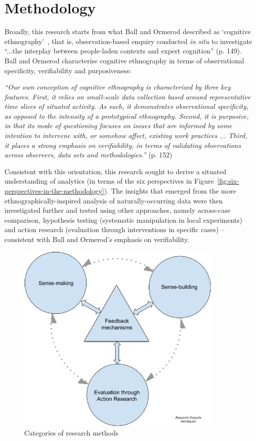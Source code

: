 \section{Methodology}
Broadly, this research starts from what Ball and Ormerod described as `cognitive ethnography'~\citep{ball2000_putting_ethnography_to_work_cognitive_ethnography}, that is, observation-based enquiry conducted \textit{in situ} to investigate ``...the interplay between people-laden contexts and expert cognition'' (p. 149). Ball and Ormerod characterise cognitive ethnography in terms of observational specificity, verifiability and purposiveness: 

\textit{``Our own conception of cognitive ethnography is characterized by three key features. First, it relies on small-scale data collection based around representative time slices of situated activity. As such, it demonstrates observational specificity, as opposed to the intensity of a prototypical ethnography. Second, it is purposive, in that its mode of questioning focuses on issues that are informed by some intention to intervene with, or somehow affect, existing work practices ... Third, it places a strong emphasis on verifiability, in terms of validating observations across observers, data sets and methodologies.''} (p. 152)

Consistent with this orientation, this research sought to derive a situated understanding of analytics (in terms of the six perspectives in Figure~\ref{fig:six-perspectives-in-the-methodology}). The insights that emerged from the more ethnographically-inspired analysis of naturally-occurring data were then investigated further and tested using other approaches, namely across-case comparison, hypothesis testing (systematic manipulation in local experiments) and action research (evaluation through interventions in specific cases) -- consistent with Ball and Ormerod's emphasis on verifiability.  

\begin{figure}
    \centering
    \includegraphics[width=10cm]{images/my/analysis-techniques-in-PhD-08-Nov-2021.jpeg}
    \caption{Categories of research methods}
    \label{fig:categories-of-research-methods}
\end{figure}


